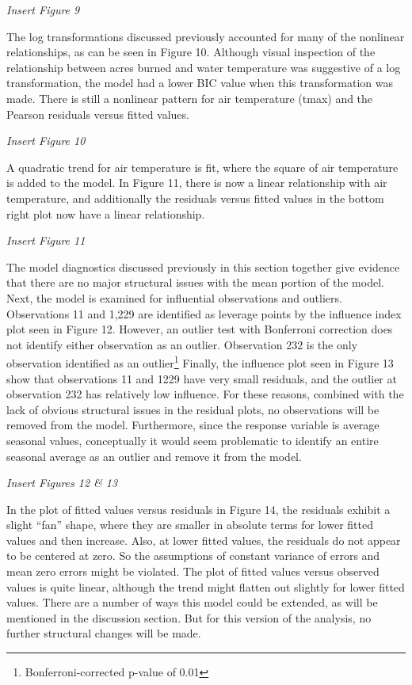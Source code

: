 \documentclass[
]{article}
\begin{document}
\emph{Insert Figure 9}

The log transformations discussed previously accounted for many of the
nonlinear relationships, as can be seen in Figure 10. Although visual
inspection of the relationship between acres burned and water
temperature was suggestive of a log transformation, the model had a
lower BIC value when this transformation was made. There is still a
nonlinear pattern for air temperature (tmax) and the Pearson residuals
versus fitted values.

\emph{Insert Figure 10}

A quadratic trend for air temperature is fit, where the square of air
temperature is added to the model. In Figure 11, there is now a linear
relationship with air temperature, and additionally the residuals versus
fitted values in the bottom right plot now have a linear relationship.

\emph{Insert Figure 11}

The model diagnostics discussed previously in this section together give
evidence that there are no major structural issues with the mean portion
of the model. Next, the model is examined for influential observations
and outliers. Observations 11 and 1,229 are identified as leverage
points by the influence index plot seen in Figure 12. However, an
outlier test with Bonferroni correction does not identify either
observation as an outlier. Observation 232 is the only observation
identified as an outlier\footnote{Bonferroni-corrected p-value of 0.01}
Finally, the influence plot seen in Figure 13 show that observations 11
and 1229 have very small residuals, and the outlier at observation 232
has relatively low influence. For these reasons, combined with the lack
of obvious structural issues in the residual plots, no observations will
be removed from the model. Furthermore, since the response variable is
average seasonal values, conceptually it would seem problematic to
identify an entire seasonal average as an outlier and remove it from the
model.

\emph{Insert Figures 12 \& 13}

In the plot of fitted values versus residuals in Figure 14, the
residuals exhibit a slight ``fan'' shape, where they are smaller in
absolute terms for lower fitted values and then increase. Also, at lower
fitted values, the residuals do not appear to be centered at zero. So
the assumptions of constant variance of errors and mean zero errors
might be violated. The plot of fitted values versus observed values is
quite linear, although the trend might flatten out slightly for lower
fitted values. There are a number of ways this model could be extended,
as will be mentioned in the discussion section. But for this version of
the analysis, no further structural changes will be made.
\end{document}
